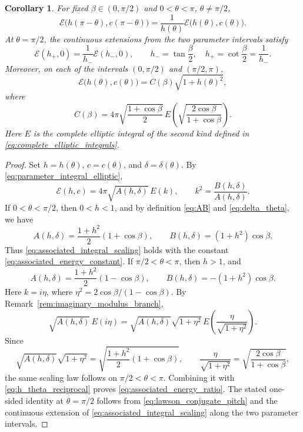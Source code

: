 \documentclass[a4paper,11pt]{amsart}
\numberwithin{equation}{section}
\theoremstyle{plain}
\newtheorem{coro}[thm]{Corollary}
\begin{document}
\begin{coro}\label{cor:energy_along_family}
For fixed $\beta\in(0,\pi/2)$ and $0<\theta<\pi$, $\theta\neq\pi/2$,
\begin{equation}\label{eq:associated_energy_ratio}
    \mathcal E\bigl(h(\pi-\theta),c(\pi-\theta)\bigr)
    =
    \frac{1}{h(\theta)}
    \mathcal E\bigl(h(\theta),c(\theta)\bigr).
\end{equation}
At $\theta=\pi/2$, the continuous extensions from the two parameter
intervals satisfy
\[
\mathcal E(h_+,0)
=
\frac{1}{h_-}\mathcal E(h_-,0),
\qquad
h_-=\tan\frac{\beta}{2},
\quad
h_+=\cot\frac{\beta}{2}=\frac{1}{h_-}.
\]
Moreover, on each of the intervals $(0,\pi/2)$ and $(\pi/2,\pi)$,
\begin{equation}\label{eq:associated_integral_scaling}
    \mathcal E\bigl(h(\theta),c(\theta)\bigr)
    =C(\beta)\sqrt{1+h(\theta)^2},
\end{equation}
where
\begin{equation}\label{eq:associated_energy_constant}
    C(\beta)=
    4\pi
    \sqrt{\frac{1+\cos\beta}{2}}\,
    E\!\left(\sqrt{\frac{2\cos\beta}{1+\cos\beta}}\right).
\end{equation}
Here $E$ is the complete elliptic integral of the second kind defined in
\eqref{eq:complete_elliptic_integrals}.
\end{coro}

\begin{proof}
Set $h=h(\theta)$, $c=c(\theta)$, and
$\delta=\delta(\theta)$. By
\eqref{eq:parameter_integral_elliptic},
\[
\mathcal E(h,c)=4\pi\sqrt{A(h,\delta)}\,E(k),
\qquad
k^2=\frac{B(h,\delta)}{A(h,\delta)}.
\]
If $0<\theta<\pi/2$, then $0<h<1$, and by definition \eqref{eq:AB} and
\eqref{eq:delta_theta}, we have
\[
A(h,\delta)=\frac{1+h^2}{2}(1+\cos\beta),
\qquad
B(h,\delta)=(1+h^2)\cos\beta.
\]
Thus \eqref{eq:associated_integral_scaling} holds with the constant
\eqref{eq:associated_energy_constant}.
If $\pi/2<\theta<\pi$, then $h>1$, and
\[
A(h,\delta)=\frac{1+h^2}{2}(1-\cos\beta),
\qquad
B(h,\delta)=-(1+h^2)\cos\beta.
\]
Here $k=i\eta$, where
$\eta^2=2\cos\beta/(1-\cos\beta)$. By
Remark~\ref{rem:imaginary_modulus_branch},
\[
\sqrt{A(h,\delta)}\,E(i\eta)
=
\sqrt{A(h,\delta)}\sqrt{1+\eta^2}\,
E\!\left(\frac{\eta}{\sqrt{1+\eta^2}}\right).
\]
Since
\[
\sqrt{A(h,\delta)}\sqrt{1+\eta^2}
=
\sqrt{\frac{1+h^2}{2}(1+\cos\beta)},
\qquad
\frac{\eta}{\sqrt{1+\eta^2}}
=
\sqrt{\frac{2\cos\beta}{1+\cos\beta}},
\]
the same scaling law follows on $\pi/2<\theta<\pi$. Combining it with \eqref{eq:h_theta_reciprocal} proves
\eqref{eq:associated_energy_ratio}.
The stated one-sided identity at $\theta=\pi/2$ follows from
\eqref{eq:lawson_conjugate_pitch} and the continuous extension of
\eqref{eq:associated_integral_scaling} along the two parameter intervals.
\end{proof}
\end{document}
